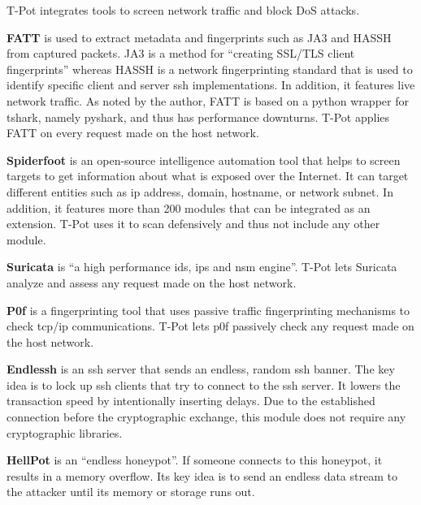 T-Pot integrates tools to screen network traffic and block DoS attacks.

\textbf{FATT} \cite{fatt2021} is used to extract metadata and fingerprints such as JA3 \cite{ja32021} and HASSH \cite{hassh2021} from captured packets.
JA3 is a method for \enquote{creating SSL/TLS client fingerprints} whereas HASSH is a network fingerprinting standard that is used to identify specific client and server \ac{ssh} implementations.
In addition, it features live network traffic.
As noted by the author, FATT is based on a python wrapper for tshark, namely pyshark, and thus has performance downturns.
T-Pot applies FATT on every request made on the host network.

\textbf{Spiderfoot} \cite{spiderfoot2021} is an open-source intelligence automation tool that helps to screen targets to get information about what is exposed over the Internet.
It can target different entities such as \ac{ip} address, domain, hostname, or network subnet.
In addition, it features more than 200 modules that can be integrated as an extension.
T-Pot uses it to scan defensively and thus not include any other module.

\textbf{Suricata} \cite{suricata2021} is \enquote{a high performance \ac{ids}, \ac{ips} and \ac{nsm} engine}.
T-Pot lets Suricata analyze and assess any request made on the host network.

\textbf{P0f} \cite{p0f2021} is a fingerprinting tool that uses passive traffic fingerprinting mechanisms to check \ac{tcp}/\ac{ip} communications.
T-Pot lets p0f passively check any request made on the host network.

\textbf{Endlessh} \cite{endlessh2021} is an \ac{ssh} server that sends an endless, random \ac{ssh} banner.
The key idea is to lock up \ac{ssh} clients that try to connect to the \ac{ssh} server.
It lowers the transaction speed by intentionally inserting delays.
Due to the established connection before the cryptographic exchange, this module does not require any cryptographic libraries.

\textbf{HellPot} \cite{hellpot2021} is an \enquote{endless honeypot}.
If someone connects to this honeypot, it results in a memory overflow.
Its key idea is to send an endless data stream to the attacker until its memory or storage runs out.

